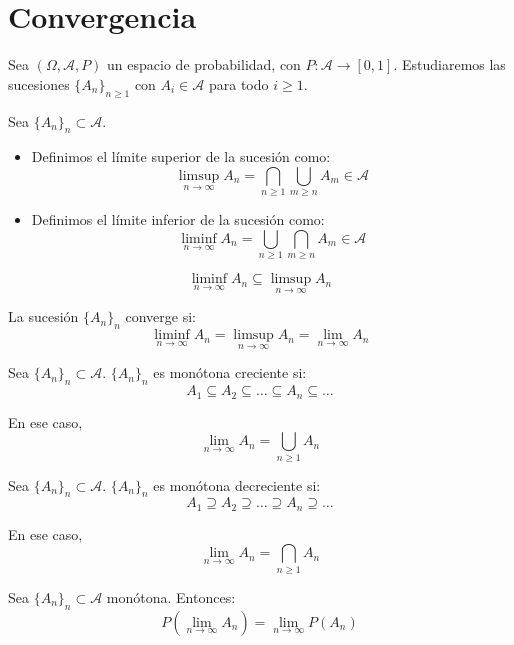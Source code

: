 \chapter{Convergencia}
Sea $(\Omega, \mathcal{A}, P)$ un espacio de probabilidad, con $P: \mathcal{A} \to [0, 1]$.
Estudiaremos las sucesiones $\{A_n\}_{n \geq 1}$ con $A_i \in \mathcal{A}$ para todo $i \geq 1$.

\begin{definition}
    Sea $\{A_n\}_n \subset \mathcal{A}$.
    \begin{itemize}
        \item Definimos el límite superior de la sucesión como:
              $$\limsup\limits_{n \to \infty} A_n = \bigcap_{n \geq 1} \bigcup_{m \geq n} A_m \in \mathcal{A}$$
        \item Definimos el límite inferior de la sucesión como:
              $$\liminf\limits_{n \to \infty} A_n = \bigcup_{n \geq 1} \bigcap_{m \geq n} A_m \in \mathcal{A}$$
    \end{itemize}
\end{definition}

\begin{remark}
    $$\liminf\limits_{n \to \infty} A_n \subseteq \limsup\limits_{n \to \infty} A_n$$
\end{remark}

La sucesión $\{A_n\}_n$ converge si:
$$\liminf\limits_{n \to \infty} A_n = \limsup\limits_{n \to \infty} A_n = \lim\limits_{n \to \infty} A_n$$

\begin{definition}
    Sea $\{A_n\}_n \subset \mathcal{A}$.
    $\{A_n\}_n$ es monótona creciente si:
    $$A_1 \subseteq A_2 \subseteq \dots \subseteq A_n \subseteq \dots$$

    En ese caso,
    $$\lim\limits_{n \to \infty} A_n = \bigcup_{n \geq 1} A_n$$
\end{definition}

\begin{definition}
    Sea $\{A_n\}_n \subset \mathcal{A}$.
    $\{A_n\}_n$ es monótona decreciente si:
    $$A_1 \supseteq A_2 \supseteq \dots \supseteq A_n \supseteq \dots$$

    En ese caso,
    $$\lim\limits_{n \to \infty} A_n = \bigcap_{n \geq 1} A_n$$
\end{definition}

\begin{theorem}
    Sea $\{A_n\}_n \subset \mathcal{A}$ monótona.
    Entonces:
    $$P(\lim\limits_{n \to \infty} A_n) = \lim\limits_{n \to \infty} P(A_n)$$
\end{theorem}

